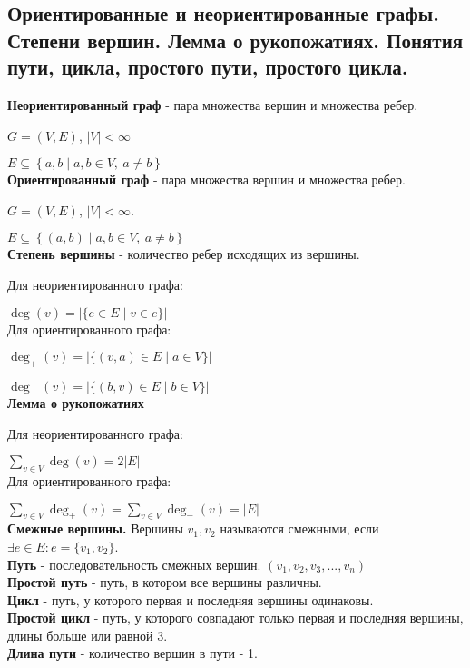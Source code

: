 \subsection{Ориентированные и неориентированные графы. Степени вершин. Лемма о рукопожатиях. Понятия пути, цикла, простого пути, простого цикла.}
\textbf{Неориентированный граф} - пара множества вершин и множества ребер.

$G = (V, E)$, $|V| < \infty$

$E \subseteq \left\{ {a, b} \mid a, b \in V, \ a \neq b\right\}$\\

\textbf{Ориентированный граф} - пара множества вершин и множества ребер.

$G = (V, E)$, $|V| < \infty$.

$E \subseteq \left\{ (a, b) \mid a, b \in V, \ a \neq b\right\}$\\

\textbf{Степень вершины} - количество ребер исходящих из вершины.

Для неориентированного графа:

$\deg (v) = |\{e \in E \mid v \in e\}|$\\

Для ориентированного графа:

$\deg_{+} (v) = |\{(v, a) \in E \mid a \in V\}|$

$\deg_{-} (v) = |\{(b, v) \in E \mid b \in V\}|$\\

\textbf{Лемма о рукопожатиях}

Для неориентированного графа:

$\sum\limits_{v \in V} \deg (v) = 2 |E|$\\

Для ориентированного графа:

$\sum\limits_{v \in V} \deg_{+} (v) = \sum\limits_{v \in V} \deg_{-} (v) = |E|$\\

\textbf{Смежные вершины.} Вершины $v_1, v_2$ называются смежными, если $\exists e \in E : e = \{v_1, v_2\}$.\\

\textbf{Путь} - последовательность смежных вершин. $(v_1, v_2, v_3, ..., v_n)$\\

\textbf{Простой путь} - путь, в котором все вершины различны.\\

\textbf{Цикл} - путь, у которого первая и последняя вершины одинаковы.\\

\textbf{Простой цикл} - путь, у которого совпадают только первая и последняя вершины, длины больше или равной 3.\\

\textbf{Длина пути} - количество вершин в пути - 1.